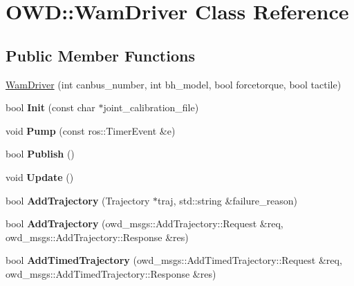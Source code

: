 \hypertarget{classOWD_1_1WamDriver}{\section{O\-W\-D\-:\-:Wam\-Driver Class Reference}
\label{classOWD_1_1WamDriver}
}
\subsection*{Public Member Functions}
\begin{DoxyCompactItemize}
\item 
\hyperlink{classOWD_1_1WamDriver_a6bb518b1c338fa042ea73371fe4e193c}{Wam\-Driver} (int canbus\-\_\-number, int bh\-\_\-model, bool forcetorque, bool tactile)
\item 
\hypertarget{classOWD_1_1WamDriver_aad247d3160b79af144b074411e9cad3f}{bool {\bfseries Init} (const char $\ast$joint\-\_\-calibration\-\_\-file)}\label{classOWD_1_1WamDriver_aad247d3160b79af144b074411e9cad3f}

\item 
\hypertarget{classOWD_1_1WamDriver_a96800b8ef4ad84abccb99aaf91821c4d}{void {\bfseries Pump} (const ros\-::\-Timer\-Event \&e)}\label{classOWD_1_1WamDriver_a96800b8ef4ad84abccb99aaf91821c4d}

\item 
\hypertarget{classOWD_1_1WamDriver_a9faad65443fa5cbe2156a75d0e18d590}{bool {\bfseries Publish} ()}\label{classOWD_1_1WamDriver_a9faad65443fa5cbe2156a75d0e18d590}

\item 
\hypertarget{classOWD_1_1WamDriver_a00a8946817f91ad2d0f883c0ce7a43e3}{void {\bfseries Update} ()}\label{classOWD_1_1WamDriver_a00a8946817f91ad2d0f883c0ce7a43e3}

\item 
\hypertarget{classOWD_1_1WamDriver_aea5772afff523f3086516b559693a801}{bool {\bfseries Add\-Trajectory} (Trajectory $\ast$traj, std\-::string \&failure\-\_\-reason)}\label{classOWD_1_1WamDriver_aea5772afff523f3086516b559693a801}

\item 
\hypertarget{classOWD_1_1WamDriver_a94b2f0531c886c2c8273724f26d9d9a6}{bool {\bfseries Add\-Trajectory} (owd\-\_\-msgs\-::\-Add\-Trajectory\-::\-Request \&req, owd\-\_\-msgs\-::\-Add\-Trajectory\-::\-Response \&res)}\label{classOWD_1_1WamDriver_a94b2f0531c886c2c8273724f26d9d9a6}

\item 
\hypertarget{classOWD_1_1WamDriver_a28e382ed78d83bae4d04a47c6873fd91}{bool {\bfseries Add\-Timed\-Trajectory} (owd\-\_\-msgs\-::\-Add\-Timed\-Trajectory\-::\-Request \&req, owd\-\_\-msgs\-::\-Add\-Timed\-Trajectory\-::\-Response \&res)}\label{classOWD_1_1WamDriver_a28e382ed78d83bae4d04a47c6873fd91}


\end{DoxyCompactItemize}
